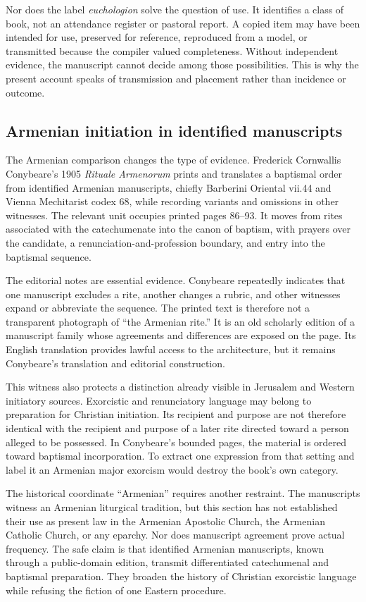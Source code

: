Nor does the label \emph{euchologion} solve the question of use. It identifies
a class of book, not an attendance register or pastoral report. A copied item
may have been intended for use, preserved for reference, reproduced from a
model, or transmitted because the compiler valued completeness. Without
independent evidence, the manuscript cannot decide among those possibilities.
This is why the present account speaks of transmission and placement rather
than incidence or outcome.

\subsection{Armenian initiation in identified manuscripts}

The Armenian comparison changes the type of evidence. Frederick Cornwallis
Conybeare's 1905 \emph{Rituale Armenorum} prints and translates a baptismal
order from identified Armenian manuscripts, chiefly Barberini Oriental
vii.44 and Vienna Mechitarist codex 68, while recording variants and omissions
in other witnesses. The relevant unit occupies printed pages 86--93. It moves
from rites associated with the catechumenate into the canon of baptism, with
prayers over the candidate, a renunciation-and-profession boundary, and entry
into the baptismal sequence.

The editorial notes are essential evidence. Conybeare repeatedly indicates
that one manuscript excludes a rite, another changes a rubric, and other
witnesses expand or abbreviate the sequence. The printed text is therefore not
a transparent photograph of ``the Armenian rite.'' It is an old scholarly
edition of a manuscript family whose agreements and differences are exposed on
the page. Its English translation provides lawful access to the architecture,
but it remains Conybeare's translation and editorial construction.

This witness also protects a distinction already visible in Jerusalem and
Western initiatory sources. Exorcistic and renunciatory language may belong to
preparation for Christian initiation. Its recipient and purpose are not
therefore identical with the recipient and purpose of a later rite directed
toward a person alleged to be possessed. In Conybeare's bounded pages, the
material is ordered toward baptismal incorporation. To extract one expression
from that setting and label it an Armenian major exorcism would destroy the
book's own category.

The historical coordinate ``Armenian'' requires another restraint. The
manuscripts witness an Armenian liturgical tradition, but this section has not
established their use as present law in the Armenian Apostolic Church, the
Armenian Catholic Church, or any eparchy. Nor does manuscript agreement prove
actual frequency. The safe claim is that identified Armenian manuscripts,
known through a public-domain edition, transmit differentiated catechumenal and
baptismal preparation. They broaden the history of Christian exorcistic
language while refusing the fiction of one Eastern procedure.

